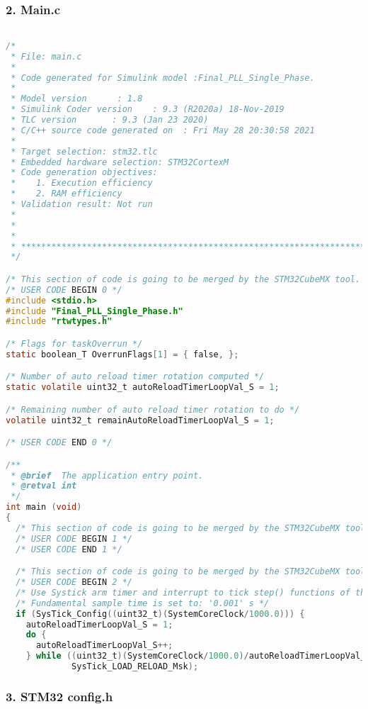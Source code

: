 \subsubsection{2. Main.c}
\begin{lstlisting}[language=C,caption=Model.c]

/*
 * File: main.c
 *
 * Code generated for Simulink model :Final_PLL_Single_Phase.
 *
 * Model version      : 1.8
 * Simulink Coder version    : 9.3 (R2020a) 18-Nov-2019
 * TLC version       : 9.3 (Jan 23 2020)
 * C/C++ source code generated on  : Fri May 28 20:30:58 2021
 *
 * Target selection: stm32.tlc
 * Embedded hardware selection: STM32CortexM
 * Code generation objectives:
 *    1. Execution efficiency
 *    2. RAM efficiency
 * Validation result: Not run
 *
 *
 *
 * ******************************************************************************
 */

/* This section of code is going to be merged by the STM32CubeMX tool. */
/* USER CODE BEGIN 0 */
#include <stdio.h>
#include "Final_PLL_Single_Phase.h"
#include "rtwtypes.h"

/* Flags for taskOverrun */
static boolean_T OverrunFlags[1] = { false, };

/* Number of auto reload timer rotation computed */
static volatile uint32_t autoReloadTimerLoopVal_S = 1;

/* Remaining number of auto reload timer rotation to do */
volatile uint32_t remainAutoReloadTimerLoopVal_S = 1;

/* USER CODE END 0 */

/**
 * @brief  The application entry point.
 * @retval int
 */
int main (void)
{
  /* This section of code is going to be merged by the STM32CubeMX tool. */
  /* USER CODE BEGIN 1 */
  /* USER CODE END 1 */

  /* This section of code is going to be merged by the STM32CubeMX tool. */
  /* USER CODE BEGIN 2 */
  /* Use Systick arm timer and interrupt to tick step() functions of the Simulink model. */
  /* Fundamental sample time is set to: '0.001' s */
  if (SysTick_Config((uint32_t)(SystemCoreClock/1000.0))) {
    autoReloadTimerLoopVal_S = 1;
    do {
      autoReloadTimerLoopVal_S++;
    } while ((uint32_t)(SystemCoreClock/1000.0)/autoReloadTimerLoopVal_S >
             SysTick_LOAD_RELOAD_Msk);

\end{lstlisting}

\subsubsection{3. STM32 config.h}

